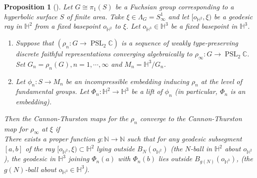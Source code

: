 \documentclass{amsart}
\newtheorem{prop}[theorem]{Proposition}
\theoremstyle{definition}
\newcommand{\Ga}{\Gamma}
\newcommand{\complexes}{\mathbb{C}}
\newcommand{\pslc}{\operatorname{PSL}_2\complexes}
\newcommand{\natls}{{\mathbb N}}
\newcommand\HHH{{\mathbb H}}
\newcommand\Hyp{{\mathbb H}}
\newcommand\til{\widetilde}
\begin{document}
\begin{prop}[\cite{mahan-series1}] \label{ptwisecrit}
	Let $G \cong \pi_1(S)$ be a Fuchsian group corresponding to a hyperbolic surface $S$ of finite area. 
	Take $\xi \in \Lambda_G=S^1_\infty$
	and let $[o_{\HHH^2},\xi )$ be a geodesic ray in $\HHH^2$ from a fixed basepoint $o_{\HHH^2}$ to $\xi$. Let $o_{\HHH^3} \in \Hyp^3$
	be a fixed basepoint in $\HHH^3$. 
	\begin{enumerate}
	\item Suppose that $(\rho_n : G \rightarrow \pslc)$ is a sequence
	of weakly type-preserving discrete faithful representations converging  algebraically to $\rho_\infty : G \rightarrow \pslc$.
	Set $G_n = \rho_n (G) , n = 1, \cdots , \infty$ and $M_n = \Hyp^3 / G_n$. 
	\item Let $\phi_n: S \to M_n$ be an incompressible embedding inducing $\rho_n$ at the level of fundamental groups. Let  $\Phi_n: \HHH^2\to \HHH^3$ be a lift of $\phi_n$ (in particular, $\Phi_n$ is an embedding).
	\end{enumerate}
	
	
	
	Then 
	the Cannon-Thurston maps for  the $\rho_n$ converge  to the Cannon-Thurston map for 
	$\rho_\infty$ at $\xi$ if \\
		 There exists a proper function $g: \natls \to \natls$ such that for any geodesic subsegment $[a,b]$ of the ray $[o_{\HHH^2}, \xi ) \subset \HHH^2$ lying outside $B_N(o_{\HHH^2})$ (the $N$-ball
		in $\HHH^2$ about $o_{\HHH^2}$),
		the geodesic in $\HHH^3$ joining $\Phi_n (a)$ with $\Phi_n (b)$ lies outside $B_{g(N)}(o_{\HHH^3})$, (the $g(N)$-ball
		about $o_{\HHH^3} \in \HHH^3$). 
\end{prop}


\begin{comment}
\begin{proof}
Apply Proposition \ref{unifcrit1} to the hyperbolic metric spaces $\til K = [1, \xi )$.
\end{proof} 
\end{comment}
\end{document}
